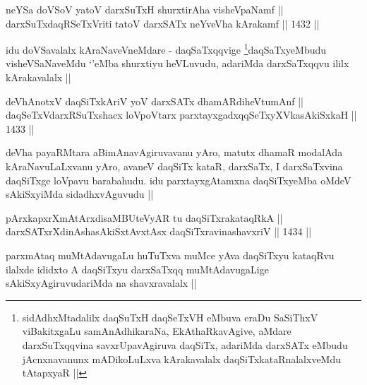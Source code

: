 
\begin{shl}
neYSa doVSoV yatoV darxSuTxH shurxtirAha visheVpaNamf ||  \\
darxSuTxdaqRSeTxVriti tatoV darxSATx neYveVha kArakamf ||  1432 ||  
\end{shl}

\begin{artha}
idu doVSavalalx kAraNaveVneMdare - daqSaTxqqvige \footnote{sidAdhxMtadalilx daqSuTxH daqSeTxVH eMbuva eraDu SaSiThxV viBakitxgaLu samAnAdhikaraNa, EkAthaRkavAgive, aMdare darxSuTxqqvina savxrUpavAgiruva daqSiTx, adariMda darxSATx eMbudu jAcnxnavanunx mADikoLuLxva kArakavalalx daqSiTxkataRnalalxveMdu tAtapxyaR ||}daqSaTxyeMbudu visheVSaNaveMdu `\stext'eMba shurxtiyu heVLuvudu, adariMda darxSaTxqqvu ililx kArakavalalx ||
\end{artha}


\begin{shl}
deVhAnotxV daqSiTxkAriV yoV darxSATx dhamARdiheVtumAnf || \\
daqSeTxVdarxRSuTxshacx loVpoV\s tarx parxtayxgadxqqSeTxyXVkasAkiSxkaH ||  1433 ||  
\end{shl}

\begin{artha}
deVha payaRMtara aBimAnavAgiruvavanu yAro, matutx dhamaR modalAda kAraNavuLaLxvanu yAro, avaneV daqSiTx kataR, darxSaTx, I darxSaTxvina daqSiTxge loVpavu barabahudu. idu parxtayxgAtamxna daqSiTxyeMba oMdeV sAkiSxyiMda sidadhxvAguvudu ||
\end{artha}


\begin{shl}
pArxkapxrXmAtArxdisaMBUteVyAR tu daqSiTxrakataqRkA || \\
darxSATxrXdinAshasAkiSxtAvxtAsx daqSiTxravinashavxriV ||  1434 || 
\end{shl}

\begin{artha}
parxmAtaq muMtAdavugaLu huTuTxva muMce yAva daqSiTxyu kataqRvu ilalxde ididxto A daqSiTxyu darxSaTxqq muMtAdavugaLige sAkiSxyAgiruvudariMda na shavxravalalx ||
\end{artha}


